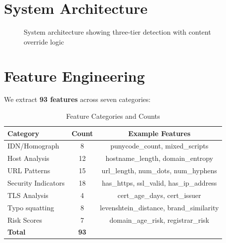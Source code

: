 \documentclass[10pt, conference]{IEEEtran}
\begin{document}
\section{System Architecture}
\label{sec:architecture}

\begin{figure}[h]
    \centering
    \caption{System architecture showing three-tier detection with content override logic}
    \label{fig:architecture}
\end{figure}

\section{Feature Engineering}
\label{sec:features}

We extract \textbf{93 features} across seven categories:

\begin{table}[t]
    \centering
    \caption{Feature Categories and Counts}
    \label{tab:features}
    \begin{tabular}{@{}lcc@{}}
        \toprule
        Category & Count & Example Features \\
        \midrule
        IDN/Homograph & 8 & punycode\_count, mixed\_scripts \\
        Host Analysis & 12 & hostname\_length, domain\_entropy \\
        URL Patterns & 15 & url\_length, num\_dots, num\_hyphens \\
        Security Indicators & 18 & has\_https, ssl\_valid, has\_ip\_address \\
        TLS Analysis & 4 & cert\_age\_days, cert\_issuer \\
        Typo squatting & 8 & levenshtein\_distance, brand\_similarity \\
        Risk Scores & 7 & domain\_age\_risk, registrar\_risk \\
        \midrule
        \textbf{Total} & \textbf{93} & \\
        \bottomrule
    \end{tabular}
\end{table}
\end{document}
